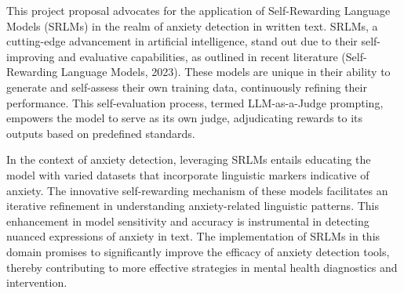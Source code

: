 \documentclass{article}
\begin{document}
This project proposal advocates for the application of Self-Rewarding Language Models (SRLMs) in the realm of anxiety detection in written text. SRLMs, a cutting-edge advancement in artificial intelligence, stand out due to their self-improving and evaluative capabilities, as outlined in recent literature (Self-Rewarding Language Models, 2023). These models are unique in their ability to generate and self-assess their own training data, continuously refining their performance. This self-evaluation process, termed LLM-as-a-Judge prompting, empowers the model to serve as its own judge, adjudicating rewards to its outputs based on predefined standards.

In the context of anxiety detection, leveraging SRLMs entails educating the model with varied datasets that incorporate linguistic markers indicative of anxiety. The innovative self-rewarding mechanism of these models facilitates an iterative refinement in understanding anxiety-related linguistic patterns. This enhancement in model sensitivity and accuracy is instrumental in detecting nuanced expressions of anxiety in text. The implementation of SRLMs in this domain promises to significantly improve the efficacy of anxiety detection tools, thereby contributing to more effective strategies in mental health diagnostics and intervention.
\end{document}
